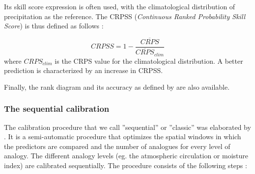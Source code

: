 \documentclass[review]{elsarticle}
\begin{document}
Its skill score expression is often used, with the climatological distribution of precipitation as the reference. The CRPSS (\textit{Continuous Ranked Probability Skill Score}) is thus defined as follows \citep{Bradley2011}:

\begin{equation}
\label{eq:CRPSS}
CRPSS = 1-\frac{\overline{CRPS}}{\overline{CRPS}_{clim}}
\end{equation}
where $CRPS_{clim}$ is the CRPS value for the climatological distribution. A better prediction is characterized by an increase in CRPSS.

Finally, the rank diagram \citep{Talagrand1997} and its accuracy as defined by \citet{Candille2005} are also available.


\subsubsection{The sequential calibration}
\label{sec:atmoswing-calibration}

The calibration procedure that we call ''sequential'' or ''classic'' was elaborated by \citet{Bontron2004} \cite[see also][]{Radanovics2013, BenDaoud2016}. It is a semi-automatic procedure that optimizes the spatial windows in which the predictors are compared and the number of analogues for every level of analogy. The different analogy levels (eg. the atmospheric circulation or moisture index) are calibrated sequentially. The procedure consists of the following steps \citep{Bontron2004}:
\end{document}
